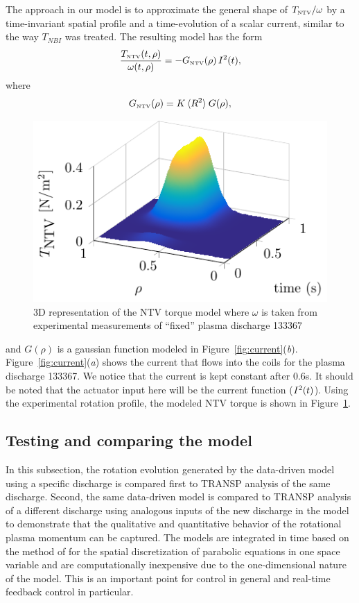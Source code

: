 \documentclass[12pt]{iopart}
\begin{document}
The approach in our model is to approximate the general shape of $T_\textrm{\tiny{NTV}}/\omega$ by a time-invariant spatial profile and a time-evolution of a scalar current, similar to the way $T_{NBI}$ was treated. The resulting model has the form  
\begin{equation}
   \frac{T_\textrm{\tiny{NTV}}(t,\rho)}{\omega(t,\rho)} = - G_\textrm{\tiny NTV}  (\rho) \, I^2(t),
\end{equation}
where
\begin{equation}
G_\textrm{\tiny NTV}  (\rho) = K \,  \langle R^2 \rangle \:G(\rho),
\end{equation}

\begin{figure}
\centering
\includegraphics{imene_figs/fig8} %
\caption{3D representation  of the NTV torque model where $\omega$ is taken from experimental measurements of ``fixed'' plasma discharge 133367}
\label{TNTV3D}
\end{figure}

and $G(\rho)$ is a gaussian function modeled in Figure~{\ref{fig:current}}(\emph{b}). Figure~{\ref{fig:current}}(\emph{a}) shows the current that flows into the coils for the plasma discharge  133367. We notice that the current is kept constant after $0.6$s. It should be noted that the actuator input here will be the current function (${I^2}\textrm(t)$). 
Using the experimental rotation profile, the modeled NTV torque is shown in Figure~\ref{TNTV3D}.

\subsection{Testing and comparing the model}

In this subsection, the rotation evolution generated by the data-driven model using a specific discharge is compared first to TRANSP analysis of the same discharge. Second, the same data-driven model is compared to TRANSP analysis of a different discharge using analogous inputs of the new discharge in the model to demonstrate that the qualitative and quantitative behavior of the rotational plasma momentum can be captured.  The models are integrated in time based on the method of \cite{Skeel90} for  the spatial discretization of parabolic equations in one space variable and are computationally inexpensive due to the one-dimensional nature of the model.  This is an important point for control in general and real-time feedback control in particular. 
\end{document}
